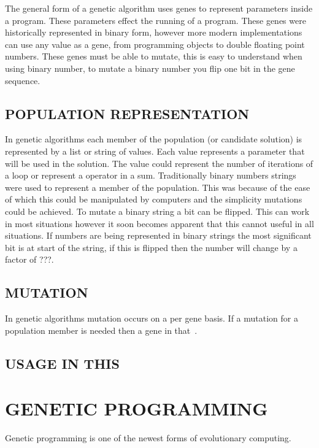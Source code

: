\documentclass[10pt,twocolumn]{article}
\begin{document}
The general form of a genetic algorithm uses genes to represent parameters inside a program.
These parameters effect the running of a program.
These genes were historically represented in binary form, however more modern implementations can use any value as a gene, from programming objects to double floating point numbers.
These genes must be able to mutate, this is easy to understand when using binary number, to mutate a binary number you flip one bit in the gene sequence. 

\subsection{POPULATION REPRESENTATION}
In genetic algorithms each member of the population (or candidate solution) is represented by a list or string of values.
Each value represents a parameter that will be used in the solution.
The value could represent the number of iterations of a loop or represent a operator in a sum.
Traditionally binary numbers strings were used to represent a member of the population.
This was because of the ease of which this could be manipulated by computers and the simplicity mutations could be achieved.
To mutate a binary string a bit can be flipped.
This can work in most situations however it soon becomes apparent that this cannot useful in all situations.
If numbers are being represented in binary strings the most significant bit is at start of the string, if this is flipped then the number will change by a factor of ???.


\subsection{MUTATION}
In genetic algorithms mutation occurs on a per gene basis. If a mutation for a population member is needed then a gene in that~\cite{j1}. 

\subsection{USAGE IN THIS}

\section{GENETIC PROGRAMMING}
Genetic programming is one of the newest forms of evolutionary computing. 
\end{document}
